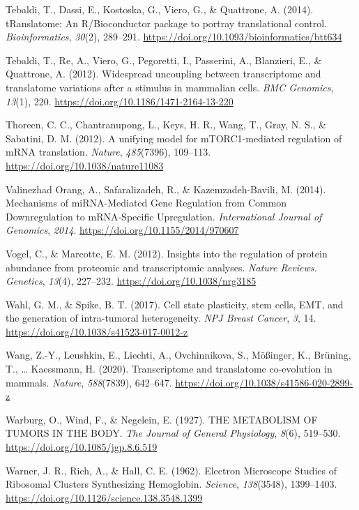 \documentclass[12pt,openany]{book}
\begin{document}
\hypertarget{ref-Tebaldi2014}{}
Tebaldi, T., Dassi, E., Kostoska, G., Viero, G., \& Quattrone, A.
(2014). tRanslatome: An R/Bioconductor package to portray translational
control. \emph{Bioinformatics}, \emph{30}(2), 289--291.
\url{https://doi.org/10.1093/bioinformatics/btt634}

\hypertarget{ref-Tebaldi2012}{}
Tebaldi, T., Re, A., Viero, G., Pegoretti, I., Passerini, A., Blanzieri,
E., \& Quattrone, A. (2012). Widespread uncoupling between transcriptome
and translatome variations after a stimulus in mammalian cells.
\emph{BMC Genomics}, \emph{13}(1), 220.
\url{https://doi.org/10.1186/1471-2164-13-220}

\hypertarget{ref-Thoreen2012}{}
Thoreen, C. C., Chantranupong, L., Keys, H. R., Wang, T., Gray, N. S.,
\& Sabatini, D. M. (2012). A unifying model for mTORC1-mediated
regulation of mRNA translation. \emph{Nature}, \emph{485}(7396),
109--113. \url{https://doi.org/10.1038/nature11083}

\hypertarget{ref-ValinezhadOrang2014}{}
Valinezhad Orang, A., Safaralizadeh, R., \& Kazemzadeh-Bavili, M.
(2014). Mechanisms of miRNA-Mediated Gene Regulation from Common
Downregulation to mRNA-Specific Upregulation. \emph{International
Journal of Genomics}, \emph{2014}.
\url{https://doi.org/10.1155/2014/970607}

\hypertarget{ref-Vogel2012}{}
Vogel, C., \& Marcotte, E. M. (2012). Insights into the regulation of
protein abundance from proteomic and transcriptomic analyses.
\emph{Nature Reviews. Genetics}, \emph{13}(4), 227--232.
\url{https://doi.org/10.1038/nrg3185}

\hypertarget{ref-Wahl2017}{}
Wahl, G. M., \& Spike, B. T. (2017). Cell state plasticity, stem cells,
EMT, and the generation of intra-tumoral heterogeneity. \emph{NPJ Breast
Cancer}, \emph{3}, 14. \url{https://doi.org/10.1038/s41523-017-0012-z}

\hypertarget{ref-Wang2020}{}
Wang, Z.-Y., Leushkin, E., Liechti, A., Ovchinnikova, S., Mößinger, K.,
Brüning, T., \ldots{} Kaessmann, H. (2020). Transcriptome and
translatome co-evolution in mammals. \emph{Nature}, \emph{588}(7839),
642--647. \url{https://doi.org/10.1038/s41586-020-2899-z}

\hypertarget{ref-Warburg1927}{}
Warburg, O., Wind, F., \& Negelein, E. (1927). THE METABOLISM OF TUMORS
IN THE BODY. \emph{The Journal of General Physiology}, \emph{8}(6),
519--530. \url{https://doi.org/10.1085/jgp.8.6.519}

\hypertarget{ref-Warner1962a}{}
Warner, J. R., Rich, A., \& Hall, C. E. (1962). Electron Microscope
Studies of Ribosomal Clusters Synthesizing Hemoglobin. \emph{Science},
\emph{138}(3548), 1399--1403.
\url{https://doi.org/10.1126/science.138.3548.1399}
\end{document}
